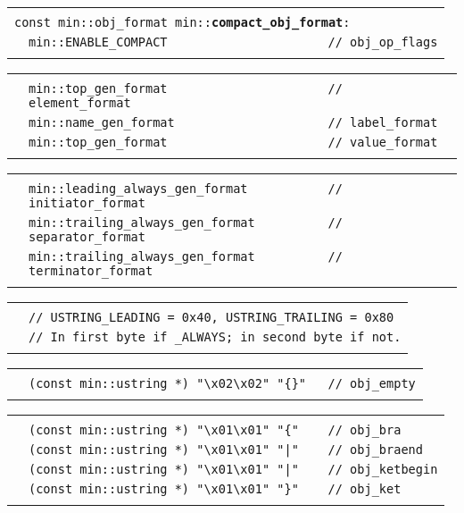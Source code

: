 \documentclass[12pt]{article}
\makeatletter
\newcommand{\TT}[1]{{\tt \bfseries #1}}
\newcommand{\ttindex}[1]{\index{#1@{\tt #1}}}
\newenvironment{indpar}[1][0.3in]%
	{\begin{list}{}%
		     {\setlength{\itemsep}{0in}%
		      \setlength{\topsep}{0in}%
		      \setlength{\parsep}{1ex}%
		      \setlength{\labelwidth}{#1}%
		      \setlength{\leftmargin}{#1}%
		      \addtolength{\leftmargin}{\labelsep}}%
	 \item}%
	{\end{list}}
\newcommand{\LABEL}[1]{\label{#1}}
\newlength{\ARGBREAKLENGTH}
\newcommand{\ARGBREAK}[1][\ARGBREAKLENGTH]{\\&\hspace*{#1}}
\newcommand{\MINKEY}[1]%
	   {\TT{#1}\ttindex{min::#1}\ttindex{#1}}
\makeatother
\begin{document}
\begin{indpar}[1em]
\begin{tabular}{r@{}l}\hspace*{0.1in} \\[-3ex]
\multicolumn{2}{l}{\tt const min::obj\_format
                   min::\MINKEY{compact\_obj\_format}:}%
\LABEL{MIN::COMPACT_OBJ_FORMAT}\ARGBREAK
\verb|min::ENABLE_COMPACT                      // obj_op_flags|\ARGBREAK
\end{tabular}

\vspace{-4ex}\begin{tabular}{r@{}l}\hspace*{0.1in}\ARGBREAK
\verb|min::top_gen_format                      // element_format|\ARGBREAK
\verb|min::name_gen_format                     // label_format|\ARGBREAK
\verb|min::top_gen_format                      // value_format|\ARGBREAK
\end{tabular}

\vspace{-4ex}\begin{tabular}{r@{}l}\hspace*{0.1in}\ARGBREAK
\verb|min::leading_always_gen_format           // initiator_format|\ARGBREAK
\verb|min::trailing_always_gen_format          // separator_format|\ARGBREAK
\verb|min::trailing_always_gen_format          // terminator_format|\ARGBREAK
\end{tabular}

\vspace{-4ex}\begin{tabular}{r@{}l}\hspace*{0.1in}\ARGBREAK
\verb|// USTRING_LEADING = 0x40, USTRING_TRAILING = 0x80|\ARGBREAK
\verb|// In first byte if _ALWAYS; in second byte if not.|\ARGBREAK
\end{tabular}

\vspace{-4ex}\begin{tabular}{r@{}l}\hspace*{0.1in}\ARGBREAK
\verb|(const min::ustring *) "\x02\x02" "{}"   // obj_empty|\ARGBREAK
\end{tabular}

\vspace{-4ex}\begin{tabular}{r@{}l}\hspace*{0.1in}\ARGBREAK
\verb|(const min::ustring *) "\x01\x01" "{"    // obj_bra|\ARGBREAK
\verb$(const min::ustring *) "\x01\x01" "|"    // obj_braend$\ARGBREAK
\verb$(const min::ustring *) "\x01\x01" "|"    // obj_ketbegin$\ARGBREAK
\verb|(const min::ustring *) "\x01\x01" "}"    // obj_ket|\ARGBREAK
\end{tabular}


\end{indpar}
\end{document}

